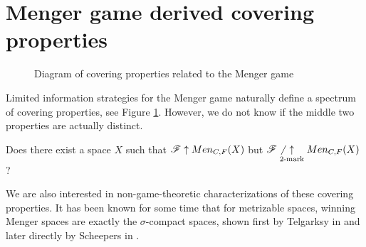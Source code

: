 \section{Menger game derived covering properties}

\begin{figure}[h]
\begin{center}
\end{center}
\caption{Diagram of covering properties related to the Menger game}
\label{menSpec}
\end{figure}

Limited information strategies for the Menger game naturally define a spectrum
of covering properties, see Figure \ref{menSpec}. However,
we do not know if the middle two properties are actually distinct.

\begin{ques}\label{perfectTo2Mark}
  Does there exist a space $X$ such that $\mathscr{F} \uparrow Men_{C,F}(X)$ but
  $\mathscr{F} \not\underset{2\text{-mark}}{\uparrow} Men_{C,F}(X)$?
\end{ques}

We are also interested in non-game-theoretic characterizations of these
covering properties. It has been known for some time that for metrizable spaces,
winning Menger spaces are exactly the $\sigma$-compact spaces, shown first
by Telgarksy in \cite{MR753073} and later directly by Scheepers in
\cite{MR1273523}.

